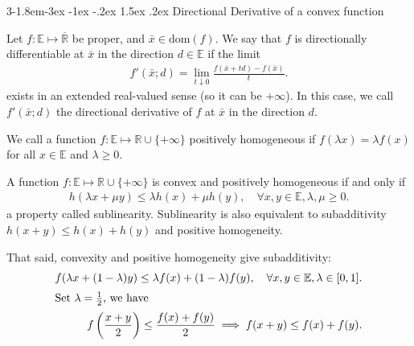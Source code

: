 \documentclass{tufte-handout}
\makeatletter
\renewcommand{\subsection}{\@startsection{subsection}%
    {3}{-1.8em}{-3ex \@plus -1ex \@minus -.2ex}%
    {1.5ex \@plus .2ex}
    {\hspace*{-5.5em}\fcolorbox{ltblue}{ltblue}{\parbox[c][1.0ex][b]{4em}{\phantom{space}}}
    \normalfont\large\itshape\color{ltblue}}}
\makeatother
\begin{document}
\subsection{Directional Derivative of a convex function}
\begin{Definition}
    Let \( f:\mathbb{E}\mapsto \overline{\mathbb{R}} \) be proper, and \( \bar x \in \text{dom}(f) \). 
    We say that \( f \) is directionally differentiable at \( \bar x \) 
    in the direction \( d \in \mathbb{E} \)
    if the limit
    \begin{align}
    f'(\bar x; d) = \lim_{t\downarrow 0} \frac{f(\bar x + td) - f(\bar x)}{t}.
    \end{align}
    exists in an extended real-valued sense (so it can be \( +\infty \)).
    In this case, we call \( f'(\bar x; d) \) the directional derivative of 
    \( f \) at \( \bar x \) in the direction \( d \).
\end{Definition}

\begin{Definition}
    We call a function \( f:\mathbb{E}\mapsto \mathbb{R}\cup \{+\infty\} \) 
    positively homogeneous if \( f(\lambda x) = \lambda f(x) \) for all \( x \in \mathbb{E} \) and \( \lambda \ge 0 \).
\end{Definition}
\begin{Proposition}
    A function \( f:\mathbb{E}\mapsto \mathbb{R}\cup \{+\infty\} \) is
    convex and positively homogeneous if and only if
    \begin{align}
        h(\lambda x + \mu y) \le \lambda h(x) + \mu h(y), \quad \forall x, y \in \mathbb{E}, \lambda, \mu \ge 0.
    \end{align}
    a property called sublinearity. Sublinearity
    is also equivalent to subadditivity \( h(x + y) \le h(x) + h(y) \) and positive homogeneity.
\end{Proposition}
That said, convexity and positive homogeneity give subadditivity:
\begin{align}
    f(\lambda x+ (1-\lambda) y) \le \lambda f(x) + (1-\lambda) f(y), \quad \forall x, y \in \mathbb{E}, \lambda \in [0, 1].\\
    \intertext{Set \( \lambda = \frac{1}{2} \), we have}
    f\left(\frac{x+y}{2}\right) \le \frac{f(x) + f(y)}{2} \implies f(x+y) \le f(x) + f(y).
\end{align}
\hfill \qedsymbol
\end{document}
